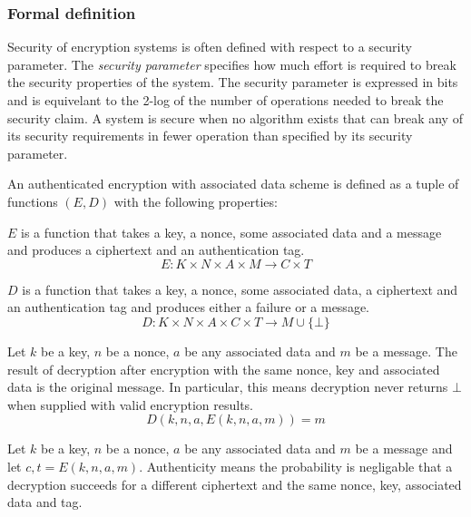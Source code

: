 \subsubsection{Formal definition}

Security of encryption systems is often defined with respect to a security
parameter. The \emph{security parameter} specifies how much effort is required
to break the security properties of the system. The security parameter is
expressed in bits and is equivelant to the 2-log of the number of operations
needed to break the security claim. A system is secure when no algorithm exists
that can break any of its security requirements in fewer operation than
specified by its security parameter.

An authenticated encryption with associated data scheme is defined as a tuple of
functions $(E, D)$ with the following properties:

$E$ is a function that takes a key, a nonce, some associated data and a message
and produces a ciphertext and an authentication tag.
\begin{equation}
    E \colon K \times N \times A \times M \to C \times T
\end{equation}

$D$ is a function that takes a key, a nonce, some associated data, a ciphertext
and an authentication tag and produces either a failure or a message.
\begin{equation}
    D \colon K \times N \times A \times C \times T \to M \cup \{ \bot \}
\end{equation}

Let $k$ be a key, $n$ be a nonce, $a$ be any associated data and $m$ be a
message. The result of decryption after encryption with the same nonce, key and
associated data is the original message. In particular, this means decryption
never returns $\bot$ when supplied with valid encryption results.
\begin{equation}
    D(k, n, a, E(k, n, a, m)) = m
\end{equation}


Let $k$ be a key, $n$ be a nonce, $a$ be any associated data and $m$ be a
message and let $c, t = E(k, n, a, m)$. Authenticity means the probability is
negligable that a decryption succeeds for a different ciphertext and the same
nonce, key, associated data and tag.

